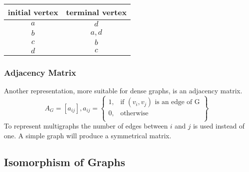 \documentclass[a4paper, 10pt]{article}
\begin{document}
\begin{multicols}{2}
    \begin{center}
    \end{center}
    \begin{tabular}{| c | c |}
        \hline
        initial vertex & terminal vertex \\
        \hline
        \(a\)          & \(d\) \\
        \(b\)          & \(a,d\) \\
        \(c\)          & \(b\) \\
        \(d\)          & \(c\) \\
        \hline
    \end{tabular}
\end{multicols}
\subsubsection{Adjacency Matrix}
Another representation, more suitable for dense graphs, is an adjacency matrix.
\[ A_G=[a_{ij}], a_{ij}=\left\{\begin{array}{lr}
    1, & \text{if } (v_i, v_j) \text{ is an edge of G} \\
    0, & \text{otherwise} \\
\end{array}\right\} \]
To represent multigraphs the number of edges between \(i\) and \(j\) is used instead of one. A simple graph will produce a symmetrical matrix.

\subsection{Isomorphism of Graphs}
\end{document}
